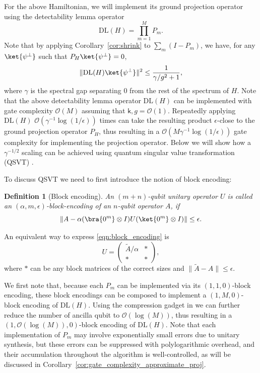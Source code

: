 \documentclass{article}
\theoremstyle{plain}
\theoremstyle{plain}
\theoremstyle{plain}
\theoremstyle{plain}
\theoremstyle{plain}
\theoremstyle{plain}
\theoremstyle{plain}
\newtheorem{defn}{Definition}
\newcommand{\wt}{\widetilde}
\newcommand{\norm}[1]{\lVert #1 \rVert}
\newcommand{\Or}{\mathcal{O}}
\begin{document}
For the above Hamiltonian, we will implement its ground projection operator using the detectability lemma operator
\begin{equation}
    \label{eq:detectability_lemma_op_ham}
    \mathrm{DL}(H) = \prod_{m=1}^M P_m.
\end{equation}
Note that by applying Corollary~\ref{cor:shrink} to $\sum_m (I-P_m)$, we have, for any $\ket{\psi^\perp}$ such that $P_H \ket{\psi^\perp}=0$, 
\begin{equation}
    \label{eq:shrink_detectability_lemma_ham}
    \|\mathrm{DL}(H)\ket{\psi^\perp}\|^2\leq \frac{1}{\gamma/g^2+1},
\end{equation}
where $\gamma$ is the spectral gap separating $0$ from the rest of the spectrum of $H$. Note that the above detectability lemma operator $\mathrm{DL}(H)$ can be implemented with gate complexity $\Or(M)$ assuming that $\mathsf{k},g=\Or(1)$. Repeatedly applying $\mathrm{DL}(H)$ $\Or(\gamma^{-1}\log(1/\epsilon))$ times can take the resulting product $\epsilon$-close to the ground projection operator $P_H$, thus resulting in a $\Or(M\gamma^{-1}\log(1/\epsilon))$ gate complexity for implementing the projection operator. Below we will show how a $\gamma^{-1/2}$ scaling can be achieved using quantum singular value transformation (QSVT) \cite{Gilyen_2019singularvalue}.

To discuss QSVT we need to first introduce the notion of block encoding:
\begin{defn}[Block encoding]
\label{defn:block_encoding}
    An $(m+n)$-qubit unitary operator $U$ is called an $(\alpha, m, \epsilon)$-block-encoding of an $n$-qubit operator $A$, if 
    \begin{equation}
    \norm{A-\alpha(\bra{0^m}\otimes I) U (\ket{0^m}\otimes I)}\leq \epsilon.
    \label{eqn:block_encoding}
    \end{equation}
\end{defn}
An equivalent way to express \eqref{eqn:block_encoding} is 
\[
U=\begin{pmatrix}
\wt{A}/\alpha & * \\
* & *
\end{pmatrix},
\]
where $*$ can be any block matrices of the correct sizes and $\|\wt{A}-A\|\leq \epsilon$.

We first note that, because each $P_m$ can be implemented via its $(1,1,0)$-block encoding, these block encodings can be composed to implement a $(1,M,0)$-block encoding of $\mathrm{DL}(H)$. Using the compression gadget in \cite{LowWiebe2018hamiltonian,FangLinTong2023time} we can further reduce the number of ancilla qubit to $\Or(\log(M))$, thus resulting in a $(1,\Or(\log(M)),0)$-block encoding of $\mathrm{DL}(H)$. Note that each implementation of $P_m$ may involve exponentially small errors due to unitary synthesis, but these errors can be suppressed with polylogarithmic overhead, and their accumulation throughout the algorithm is well-controlled, as will be discussed in Corollary~\ref{cor:gate_complexity_approximate_proj}.
\end{document}
